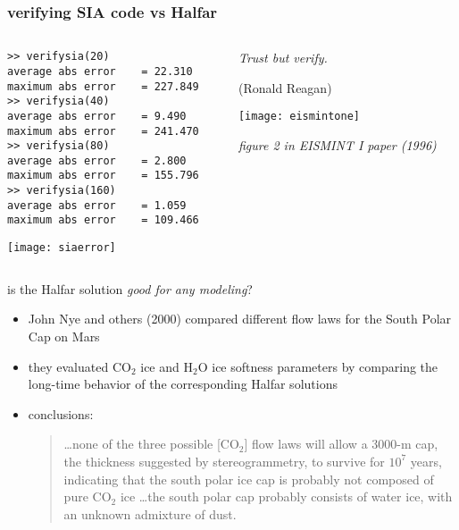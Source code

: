 \begin{frame}[fragile]
\frametitle{verifying SIA code vs Halfar}

\begin{columns}
\begin{column}{0.6\textwidth}
\scriptsize
\vspace{-5mm}
\begin{verbatim}
>> verifysia(20)
average abs error    = 22.310
maximum abs error    = 227.849
>> verifysia(40)
average abs error    = 9.490
maximum abs error    = 241.470
>> verifysia(80)
average abs error    = 2.800
maximum abs error    = 155.796
>> verifysia(160)
average abs error    = 1.059
maximum abs error    = 109.466
\end{verbatim}
\normalsize

\texttt{[image: siaerror]}
\end{column}

\begin{column}{0.4\textwidth}
\small
\emph{Trust but verify.}
\medskip

\scriptsize
(Ronald Reagan)

\bigskip\bigskip\bigskip

\texttt{[image: eismintone]}

\scriptsize \emph{figure 2 in EISMINT I paper (1996)}
\end{column}
\end{columns}
\end{frame}


\begin{frame}{is the Halfar solution \emph{good for any modeling}?}

\begin{itemize}
\item John Nye and others (2000)\nocite{NyeIcarus2000} compared different flow laws for the South Polar Cap on Mars
\item they evaluated $\text{CO}_2$ ice and $\text{H}_2\text{O}$ ice softness parameters by comparing the long-time behavior of the corresponding Halfar solutions
\item conclusions:
  \begin{quote}
  \dots none of the three possible [$\text{CO}_2$] flow laws will allow a 3000-m cap, the thickness suggested by stereogrammetry, to survive for $10^7$ years, indicating that the south polar ice cap is probably not composed of pure $\text{CO}_2$ ice \dots the south polar cap probably consists of water ice, with an unknown admixture of dust.
  \end{quote}
\end{itemize}
\end{frame}


